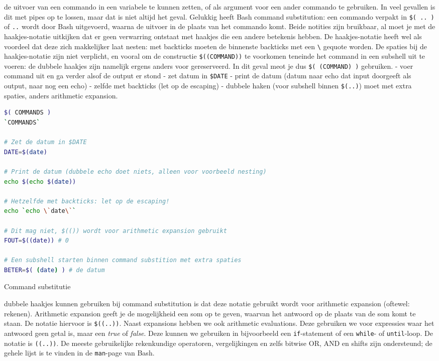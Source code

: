  de uitvoer van een commando in een variabele te kunnen zetten, of als argument voor een ander commando te gebruiken. In veel gevallen is dit met pipes op te lossen, maar dat is niet altijd het geval. Gelukkig heeft Bash command substitution: een commando verpakt in \texttt{\$(\ ..\ )} of \texttt{\textasciigrave{}..\textasciigrave{}} wordt door Bash uitgevoerd, waarna de uitvoer in de plaats van het commando komt. Beide notities zijn bruikbaar, al moet je met de haakjes-notatie uitkijken dat er geen verwarring ontstaat met haakjes die een andere betekenis hebben. De haakjes-notatie heeft wel als voordeel dat deze zich makkelijker laat nesten: met backticks moeten de binnenste backticks met een \texttt{\textbackslash{}} gequote worden. De spaties bij de haakjes-notatie zijn niet verplicht, en vooral om de constructie \texttt{\$((COMMAND))} te voorkomen teneinde het command in een subshell uit te voeren: de dubbele haakjes zijn namelijk ergens anders voor gereserveerd. In dit geval meot je dus \texttt{\$(\ (COMMAND)\ )} gebruiken. - voer command uit en ga verder alsof de output er stond - zet datum in \texttt{\$DATE} - print de datum (datum naar echo dat input doorgeeft als output, naar nog een echo) - zelfde met backticks (let op de escaping) - dubbele haken (voor subshell binnen \texttt{\$(..)}) moet met extra spaties, anders arithmetic expansion.

\begin{listing}
\begin{lstlisting}[language=bash]
$( COMMANDS )
`COMMANDS`

# Zet de datum in $DATE
DATE=$(date)

# Print de datum (dubbele echo doet niets, alleen voor voorbeeld nesting)
echo $(echo $(date))

# Hetzelfde met backticks: let op de escaping!
echo `echo \`date\``

# Dit mag niet, $(()) wordt voor arithmetic expansion gebruikt
FOUT=$((date)) # 0

# Een subshell starten binnen command substition met extra spaties
BETER=$( (date) ) # de datum  
\end{lstlisting}
\caption{Command substitutie}
\end{listing}

 dubbele haakjes kunnen gebruiken bij command substitution is dat deze notatie gebruikt wordt voor arithmetic expansion (oftewel: rekenen). Arithmetic expansion geeft je de mogelijkheid een som op te geven, waarvan het antwoord op de plaats van de som komt te staan. De notatie hiervoor is \texttt{\$((..))}. Naast expansions hebben we ook arithmetic evaluations. Deze gebruiken we voor expressies waar het antwoord geen getal is, maar een \emph{true} of \emph{false}. Deze kunnen we gebruiken in bijvoorbeeld een \texttt{if}-statement of een \texttt{while}- of \texttt{until}-loop. De notatie is \texttt{((..))}. De meeste gebruikelijke rekenkundige operatoren, vergelijkingen en zelfs bitwise OR, AND en shifts zijn ondersteund; de gehele lijst is te vinden in de \texttt{man}-page van Bash.

